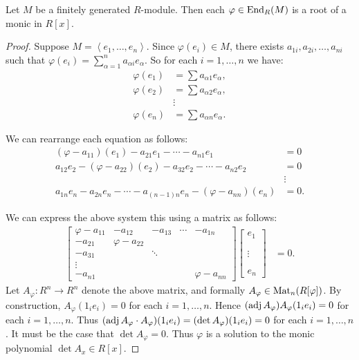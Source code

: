 \begin{theorem}
	Let $M$ be a finitely generated $R$-module. Then each $\varphi \in \operatorname{End}_R(M)$ is a root of a monic in $R[x]$. 
\end{theorem}
	\begin{proof}
		Suppose $M = \left<e_1,\ldots ,e_n \right>$. Since $\varphi(e_i) \in M$, there exists $a_{1i},a_{2i},\ldots ,a_{ni}$ such that $\varphi(e_i) = \sum_{\alpha =1}^{n} a_{\alpha i}e_{\alpha}$. So for each $i = 1,\ldots ,n$ we have:
		\begin{align*}
\varphi(e_1) &= \sum a_{\alpha 1}e_\alpha,\\
\varphi(e_2) &= \sum a_{\alpha 2}e_\alpha,\\
&\vdots\\
\varphi(e_n) &= \sum a_{\alpha n}e_\alpha.
\end{align*}

We can rearrange each equation as follows:
\begin{align*}
(\varphi-a_{11})(e_1)-a_{21}e_1-\cdots-a_{n1}e_1 &= 0\\
a_{12}e_2-(\varphi-a_{22})(e_2)-a_{32}e_2-\cdots-a_{n2}e_2 &= 0\\
&\vdots\\
a_{1n}e_n-a_{2n}e_n-\cdots-a_{(n-1)n}e_n-(\varphi-a_{nn})(e_n) &= 0.
\end{align*}

We can express the above system this using a matrix as follows:
\begin{align*}
\begin{bmatrix}
\varphi-a_{11} & -a_{12} & -a_{13} & \cdots & -a_{1n}\\
-a_{21} & \varphi-a_{22} & & & \\
-a_{31} & & \ddots & & \\
\vdots & & & & \\
-a_{n1} & & & & \varphi-a_{nn}
\end{bmatrix}
\begin{bmatrix}
	e_1\\\phantom{a} \\
	\vdots\\\phantom{a}\\
e_n
\end{bmatrix}
&= 0.
\end{align*}
Let $A_\varphi:R^n \rightarrow R^n$ denote the above matrix, and formally $A_\varphi \in \operatorname{Mat}_n(R[\varphi])$. By construction, $A_\varphi(1_i e_i) = 0$ for each $i=1,\ldots ,n$. Hence $(\operatorname{adj} A_\varphi)A_\varphi(1_i e_i) = 0$ for each $i=1,\ldots ,n$. Thus $(\operatorname{adj} A_\varphi \cdot A_\varphi)(1_i e_i) = (\det A_\varphi)(1_i e_i) = 0$ for each $i=1,\ldots ,n$. It must be the case that $\det A_\varphi = 0$. Thus $\varphi$ is a solution to the monic polynomial $\det A_x \in R[x]$.
	\end{proof}


